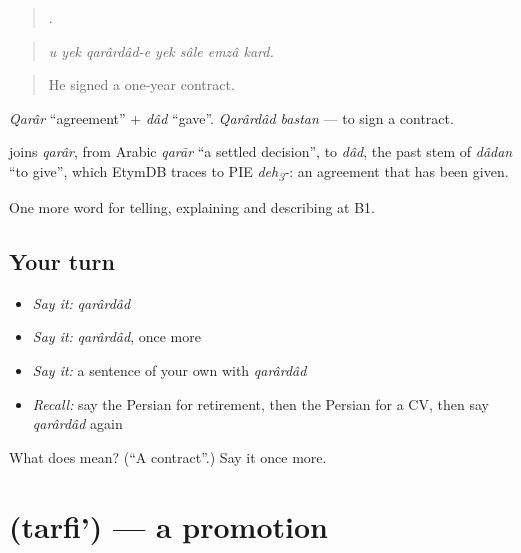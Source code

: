 \begin{quote}
      .
\end{quote}

\begin{quote}
\emph{u yek qarârdâd-e yek sâle emzâ kard.}
\end{quote}

\begin{quote}
He signed a one-year contract.
\end{quote}

\emph{Qarâr} \textquotedblleft{}agreement\textquotedblright{} + \emph{dâd} \textquotedblleft{}gave\textquotedblright{}. \emph{Qarârdâd bastan} — to sign a contract.

\begin{cousinweb}
\textbf{} joins \emph{qarâr}, from Arabic \emph{qarār} \textquotedblleft{}a settled decision\textquotedblright{}, to \emph{dâd}, the past stem of \emph{dâdan} \textquotedblleft{}to give\textquotedblright{}, which EtymDB traces to PIE \emph{deh\textsubscript{3}-}: an agreement that has been given.
\end{cousinweb}

\begin{grammarlens}[title={What you've built}]
One more word for telling, explaining and describing at B1.
\end{grammarlens}

\subsection*{Your turn}
\begin{itemize}
\raggedright
  \item \emph{Say it:} \emph{qarârdâd}
  \item \emph{Say it:} \emph{qarârdâd}, once more
  \item \emph{Say it:} a sentence of your own with \emph{qarârdâd}
  \item \emph{Recall:} say the Persian for retirement, then the Persian for a CV, then say \emph{qarârdâd} again
\end{itemize}

\begin{tcolorbox}[breakable,colback=teal!4,colframe=teal!35!black,title={Before you move on}]
What does  mean? (\textquotedblleft{}A contract\textquotedblright{}.) Say it once more.
\end{tcolorbox}
\section[\texorpdfstring{\fa{ترفیع} (tarfi')}{ترفیع (tarfi')}]{ (tarfi') — a promotion}

